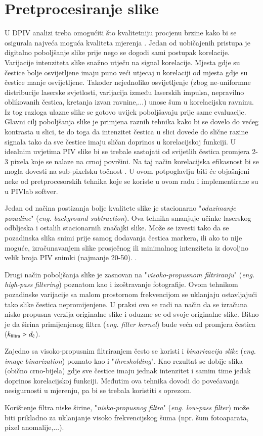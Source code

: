 \section{Pretprocesiranje slike}
U DPIV analizi treba omogućiti što kvalitetniju procjenu brzine kako bi se osigurala najveća moguća kvaliteta mjerenja \cite{thielicke2014_article}. Jedan od uobičajenih pristupa je digitalno poboljšanje slike prije nego se dogodi sami postupak korelacije. Varijacije intenziteta slike snažno utječu na signal korelacije. Mjesta gdje su čestice bolje osvijetljene imaju puno veći utjecaj u korelaciji od mjesta gdje su čestice manje osvijetljene. Također nejednoliko osvijetljenje (zbog ne-uniformne distribucije laserske svjetlosti, varijacija između laserskih impulsa, nepravilno oblikovanih čestica, kretanja izvan ravnine,...) unose šum u korelacijsku ravninu. Iz tog razloga ulazne slike se gotovo uvijek poboljšavaju prije same evaluacije. Glavni cilj poboljšanja slike je primjena raznih tehnika kako bi se dovelo do većeg kontrasta u slici, te do toga da intenzitet čestica u slici dovede do slične razine signala tako da sve čestice imaju sličan doprinos u korelacijskoj funkciji. U idealnim uvjetima PIV slike bi se trebale sastojati od svijetlih čestica promjera 2-3 pixela koje se nalaze na crnoj površini. Na taj način korelacijska efikasnost bi se mogla dovesti na sub-pixelsku točnost \cite{mendez2017pod}. U ovom potpoglavlju biti će objašnjeni neke od pretprocesorskih tehnika koje se koriste u ovom radu i implementirane su u PIVlab softver.
\par
Jedan od načina postizanja bolje kvalitete slike je stacionarno "\textit{oduzimanje pozadine}" (\textit{eng. background subtraction}). Ova tehnika  smanjuje učinke laserskog odbljeska i ostalih stacionarnih značajki slike. Može se izvesti tako da se pozadinska slika snimi prije samog dodavanja čestica markera, ili ako to nije moguće, izračunavanjem slike prosječnog ili  minimalnog intenziteta iz dovoljno velik broja PIV snimki (najmanje 20-50). \cite{raffel2018_book}.
\par
Drugi način poboljšanja slike je zasnovan na "\textit{visoko-propusnom filtriranju}" (\textit{eng. high-pass filtering}) poznatom kao i izoštravanje fotografije. Ovom tehnikom pozadinske varijacije sa malom prostornom frekvencijom se uklanjaju ostavljajući tako slike čestica nepromijenjene. U praksi ovo se radi na način da se izračuna nisko-propusna verzija originalne slike i oduzme se od svoje originalne slike. Bitno je da širina primijenjenog filtra (\textit{eng. filter kernel}) bude veća od promjera čestica ($k_{\textup{filtra}}>d_\textup{č}$).
\par
Zajedno sa visoko-propusnim filtriranjem često se koristi i \textit{binarizacija slike} (\textit{eng. image binarization}) poznato kao i "\textit{thresholding}". Kao rezultat se dobije slika (obično crno-bijela) gdje sve čestice imaju jednak intenzitet i samim time jedak doprinos korelacijskoj funkciji. Međutim ova tehnika dovodi do povećavanja nesigurnosti u mjerenju, pa bi se trebala koristiti s oprezom.
\par
Korištenje filtra niske širine, "\textit{nisko-propusnog filtra}" (\textit{eng. low-pass filter}) može biti prikladno za uklanjanje visoko frekvencijskog šuma (npr. šum fotoaparata, pixel anomalije,...).
